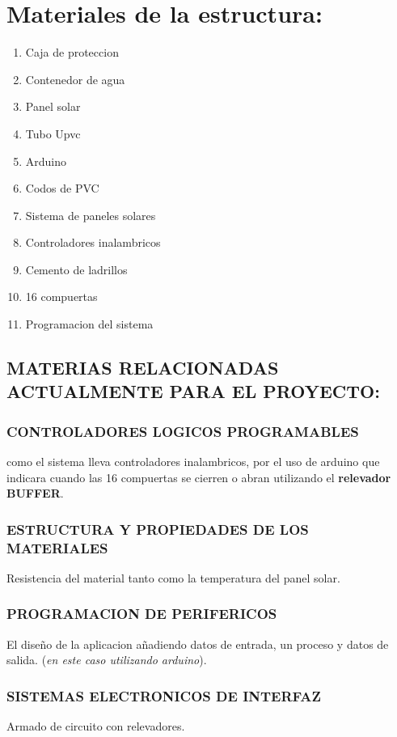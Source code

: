 \documentclass[11pt,a4paper]{article}
\begin{document}
\section{Materiales de la estructura:}
\begin{enumerate}
\item Caja de proteccion
\item Contenedor de agua
\item Panel solar
\item Tubo Upvc
\item Arduino
\item Codos de PVC
\item Sistema de paneles solares
\item Controladores inalambricos
\item Cemento de ladrillos
\item 16 compuertas
\item Programacion del sistema
\end{enumerate}

\begin{center}
\subsection{MATERIAS RELACIONADAS ACTUALMENTE PARA EL PROYECTO:}
\end{center}

\subsubsection{CONTROLADORES LOGICOS PROGRAMABLES}
como el sistema lleva controladores inalambricos, por el uso de arduino que indicara cuando las 16 compuertas se cierren o abran utilizando el \textbf{relevador BUFFER}.
\subsubsection{ESTRUCTURA Y PROPIEDADES DE LOS MATERIALES}
Resistencia del material tanto como la temperatura del panel solar.
\subsubsection{PROGRAMACION DE PERIFERICOS}
El diseño de la aplicacion añadiendo datos de entrada, un proceso y datos de salida. (\emph{en este caso utilizando arduino}). 
\subsubsection{SISTEMAS ELECTRONICOS DE INTERFAZ}
Armado de circuito con relevadores.
\end{document}
